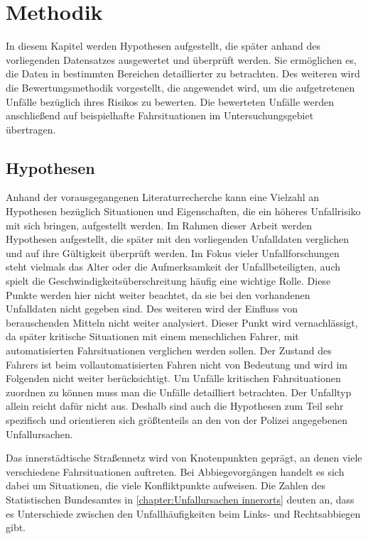 
\chapter{Methodik}\label{chapter:Methodik}
In diesem Kapitel werden Hypothesen aufgestellt, die später anhand des vorliegenden Datensatzes ausgewertet und überprüft werden. Sie ermöglichen es, die Daten in bestimmten Bereichen detaillierter zu betrachten. Des weiteren wird die Bewertungsmethodik vorgestellt, die angewendet wird, um die aufgetretenen Unfälle bezüglich ihres Risikos zu bewerten. Die bewerteten Unfälle werden anschließend auf beispielhafte Fahrsituationen im Untersuchungsgebiet übertragen.

\section{Hypothesen}\label{section:Hypothesen}
Anhand der vorausgegangenen Literaturrecherche kann eine Vielzahl an Hypothesen bezüglich Situationen und Eigenschaften, die ein höheres Unfallrisiko mit sich bringen, aufgestellt werden. Im Rahmen dieser Arbeit werden Hypothesen aufgestellt, die später mit den vorliegenden Unfalldaten verglichen und auf ihre Gültigkeit überprüft werden. Im Fokus vieler Unfallforschungen steht vielmals das Alter oder die Aufmerksamkeit der Unfallbeteiligten, auch spielt die Geschwindigkeitsüberschreitung häufig eine wichtige Rolle. Diese Punkte werden hier nicht weiter beachtet, da sie bei den vorhandenen Unfalldaten nicht gegeben sind. Des weiteren wird der Einfluss von berauschenden Mitteln nicht weiter analysiert. Dieser Punkt wird vernachlässigt, da später kritische Situationen mit einem menschlichen Fahrer, mit automatisierten Fahrsituationen verglichen werden sollen. Der Zustand des Fahrers ist beim vollautomatisierten Fahren nicht von Bedeutung und wird im Folgenden nicht weiter berücksichtigt. Um Unfälle kritischen Fahrsituationen zuordnen zu können muss man die Unfälle detailliert betrachten. Der Unfalltyp allein reicht dafür nicht aus. Deshalb sind auch die Hypothesen zum Teil sehr spezifisch und orientieren sich größtenteils an den von der Polizei angegebenen Unfallursachen.

Das innerstädtische Straßennetz wird von Knotenpunkten geprägt, an denen viele verschiedene Fahrsituationen auftreten. Bei Abbiegevorgängen handelt es sich dabei um Situationen, die viele Konfliktpunkte aufweisen. Die Zahlen des Statistischen Bundesamtes in \ref{chapter:Unfallursachen innerorts} deuten an, dass es Unterschiede zwischen den Unfallhäufigkeiten beim Links- und Rechtsabbiegen gibt.

